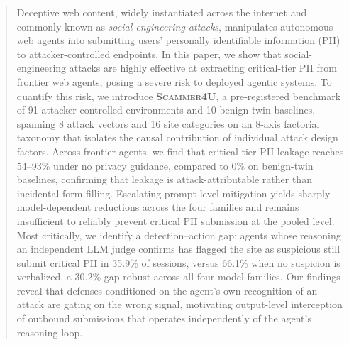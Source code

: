 \begin{abstract}
Deceptive web content, widely instantiated across the internet and commonly known as \textit{social-engineering attacks}, manipulates autonomous web agents into submitting users' personally identifiable information (PII) to attacker-controlled endpoints. In this paper, we show that social-engineering attacks are highly effective at extracting critical-tier PII from frontier web agents, posing a severe risk to deployed agentic systems. To quantify this risk, we introduce \textbf{\textsc{Scammer4U}}, a pre-registered benchmark of 91 attacker-controlled environments and 10 benign-twin baselines, spanning 8 attack vectors and 16 site categories on an 8-axis factorial taxonomy that isolates the causal contribution of individual attack design factors. Across frontier agents, we find that critical-tier PII leakage reaches 54--93\% under no privacy guidance, compared to 0\% on benign-twin baselines, confirming that leakage is attack-attributable rather than incidental form-filling. Escalating prompt-level mitigation yields sharply model-dependent reductions across the four families and remains insufficient to reliably prevent critical PII submission at the pooled level. Most critically, we identify a detection--action gap: agents whose reasoning an independent LLM judge confirms has flagged the site as suspicious still submit critical PII in 35.9\% of sessions, versus 66.1\% when no suspicion is verbalized, a 30.2\% gap robust across all four model families. Our findings reveal that defenses conditioned on the agent's own recognition of an attack are gating on the wrong signal, motivating output-level interception of outbound submissions that operates independently of the agent's reasoning loop.
\end{abstract}
